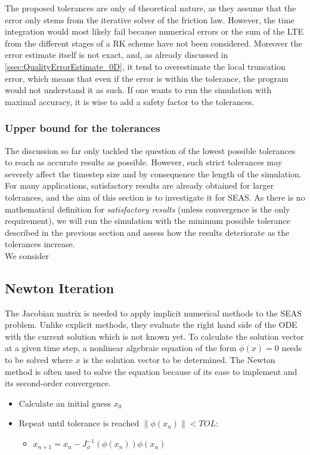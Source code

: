 The proposed tolerances are only of theoretical nature, as they assume that the error only stems from the iterative solver of the friction law. However, the time integration would most likely fail because numerical errors or the sum of the LTE from the different stages of a RK scheme have not been considered. Moreover the error estimate itself is not exact, and, as already discussed in \autoref{ssec:QualityErrorEstimate_0D}, it tend to overestimate the local truncation error, which means that even if the error is within the tolerance, the program would not understand it as such. If one wants to run the simulation with maximal accuracy, it is wise to add a safety factor to the tolerances.

\subsubsection{Upper bound for the tolerances}
The discussion so far only tackled the question of the lowest possible tolerances to reach as accurate results as possible. However, such strict tolerances may severely affect the timestep size and by consequence the length of the simulation. For many applications, satisfactory results are already obtained for larger tolerances, and the aim of this section is to investigate it for SEAS. As there is no mathematical definition for \textit{satisfactory results} (unless convergence is the only requirement), we will run the simulation with the minimum possible tolerance described in the previous section and assess how the results deteriorate as the tolerances increase. \\
We consider 


\subsection{Newton Iteration}
\label{ssec:ConvergenceNewtonIteration}
The Jacobian matrix is needed to apply implicit numerical methods to the SEAS problem. Unlike explicit methods, they evaluate the right hand side of the ODE with the current solution which is not known yet. To calculate the solution vector at a given time step, a nonlinear algebraic equation of the form $\phi(x) = 0$ needs to be solved where $x$ is the solution vector to be determined. The Newton method is often used to solve the equation because of its ease to implement and its second-order convergence. 

\begin{itemize}
	\item Calculate an initial guess $x_0$
	\item Repeat until tolerance is reached $\|\phi(x_n)\| < TOL$: 
	\begin{itemize}
		\item $x_{n+1} = x_n - J_\phi^{-1}(\phi(x_n)) \phi(x_n)$
	\end{itemize} 
\end{itemize}

